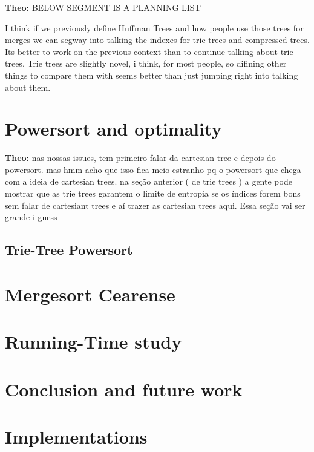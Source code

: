 \documentclass[a4paper]{article}
\theoremstyle{plain}
\theoremstyle{definition}
\begin{document}
\textbf{Theo:} BELOW SEGMENT IS A PLANNING LIST 

I think if we previously define Huffman Trees and how people use those trees for merges
we can segway into talking the indexes for trie-trees and compressed trees. 
Its better to work on the previous context than to continue talking about trie trees.
Trie trees are slightly novel, i think, for most people, so difining other things to compare them with
seems better than just jumping right into talking about them. 

\section{Powersort and optimality}
\textbf{Theo:} nas nossas issues, tem primeiro falar da cartesian tree e depois do powersort.
mas hmm acho que isso fica meio estranho pq o powersort que chega com 
a ideia de cartesian trees. na seção anterior ( de trie trees )
a gente pode mostrar que as trie trees garantem o limite de entropia se 
os índices forem bons sem falar de cartesiant trees e aí trazer
as cartesian trees aqui. Essa seção vai ser grande i guess
\subsection{Trie-Tree Powersort}

\section{Mergesort Cearense}

\section{Running-Time study}

\section{Conclusion and future work}

\section{Implementations}
\end{document}
